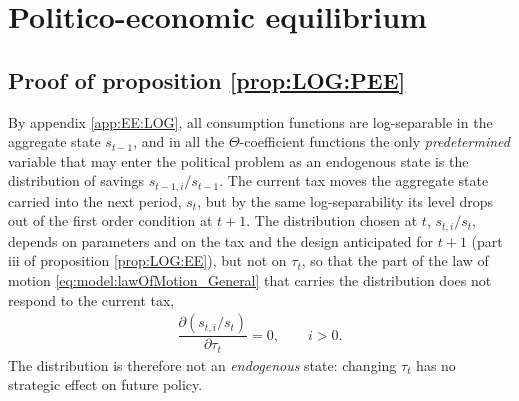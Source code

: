 \section{Politico-economic equilibrium}\label{app:PEE}\setcounter{equation}{0}

\subsection{Proof of proposition \ref{prop:LOG:PEE}}\label{app:PEE:LOG}
By appendix \ref{app:EE:LOG}, all consumption functions are log-separable in the aggregate state $s_{t-1}$, and in all the $\Theta$-coefficient functions the only \textit{predetermined} variable that may enter the political problem as an endogenous state is the distribution of savings $s_{t-1,i}/s_{t-1}$. The current tax moves the aggregate state carried into the next period, $s_t$, but by the same log-separability its level drops out of the first order condition at $t+1$. The distribution chosen at $t$, $s_{t,i}/s_t$, depends on parameters and on the tax and the design anticipated for $t+1$ (part iii of proposition \ref{prop:LOG:EE}), but not on $\tau_t$, so that the part of the law of motion \eqref{eq:model:lawOfMotion_General} that carries the distribution does not respond to the current tax,
\begin{align*}
    \dfrac{\partial \left(s_{t,i}/s_t\right)}{\partial \tau_t} = 0, \qquad i>0.
\end{align*}
The distribution is therefore not an \textit{endogenous} state: changing $\tau_t$ has no strategic effect on future policy.

